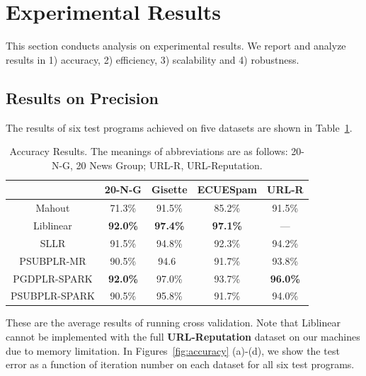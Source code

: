 \documentclass[10pt, conference, compsocconf]{IEEEtran}
\begin{document}
\section{Experimental Results} \label{sec:experiment}
This section conducts analysis on experimental results.
We report and analyze results in 1) accuracy, 2) efficiency, 3) scalability and 4) robustness.

\subsection{Results on Precision} \label{sec:precision}
The results of six test programs achieved on five datasets are shown in Table~\ref{tab:table3}.
%
\begin{table}[h]
\centering
\caption{Accuracy Results. The meanings of abbreviations are as follows: 20-N-G, 20 News Group; URL-R, URL-Reputation.}\label{tab:table3}\vspace{-0.3cm}
\begin{tabular}{|c|c|c|c|c|}
\hline
           & 20-N-G & Gisette & ECUESpam & URL-R \\
\hline
Mahout     & 71.3\% & 91.5\% & 85.2\% & 91.5\% \\
\hline
Liblinear  & \textbf{92.0\%} & \textbf{97.4\%} & \textbf{97.1\%} & --- \\
\hline
SLLR       & 91.5\% & 94.8\% & 92.3\% & 94.2\% \\
\hline
PSUBPLR-MR & 90.5\% & 94.6\ & 91.7\% & 93.8\% \\
\hline
PGDPLR-SPARK & \textbf{92.0\%} & 97.0\% & 93.7\% & \textbf{96.0\%} \\
\hline
PSUBPLR-SPARK & 90.5\% & 95.8\% & 91.7\% & 94.0\% \\
\hline
\end{tabular}
\end{table}
%
These are the average results of running cross validation. Note that Liblinear cannot be implemented with the full \textbf{URL-Reputation} dataset on our machines due to memory limitation.
In Figures~\ref{fig:accuracy} (a)-(d), we show the test error as a function of iteration number on each dataset for all six test programs.
\end{document}
